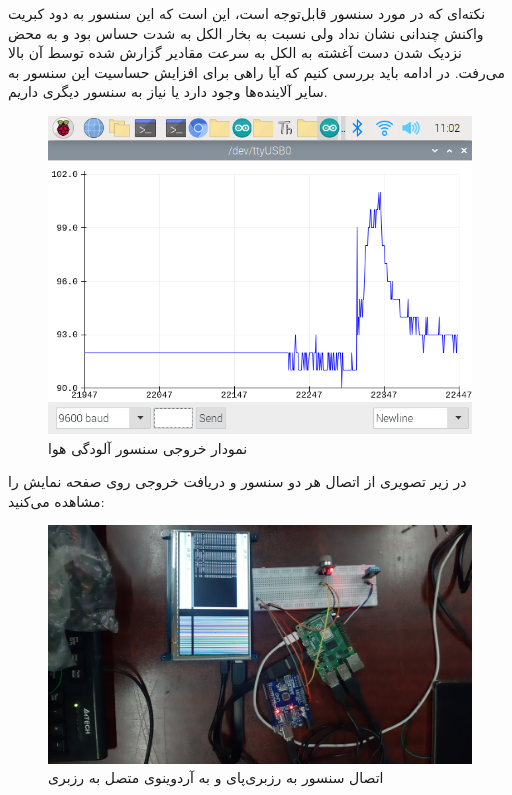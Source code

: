 \documentclass[12pt]{article}
\begin{document}
\begin{itemize}
		نکته‌ای که در مورد سنسور  قابل‌توجه است، این است که این سنسور به دود کبریت واکنش چندانی نشان نداد ولی نسبت به بخار الکل به شدت حساس بود و به محض نزدیک شدن دست آغشته به الکل به سرعت مقادیر گزارش شده توسط آن بالا می‌رفت. در ادامه باید بررسی کنیم که آیا راهی برای افزایش حساسیت این سنسور به سایر آلاینده‌ها وجود دارد یا نیاز به سنسور دیگری داریم.
	
	\begin{figure}[H]
		\begin{center}
			\includegraphics[width=.6\textwidth]{images/mq135-graph.png}
		\end{center}
		\caption{نمودار خروجی سنسور آلودگی هوا}
	\end{figure}

	
	در زیر تصویری از اتصال هر دو سنسور و دریافت خروجی روی صفحه نمایش را مشاهده می‌کنید:
	
	
	
	\begin{figure}[H]
		\begin{center}
			\includegraphics[width=.70\textwidth]{images/dhtmq1.jpg} 
		\end{center}
		\caption{اتصال سنسور    به رزبری‌پای و  به آردوینوی متصل به رزبری}
	\end{figure}
	

\end{itemize}
\end{document}
